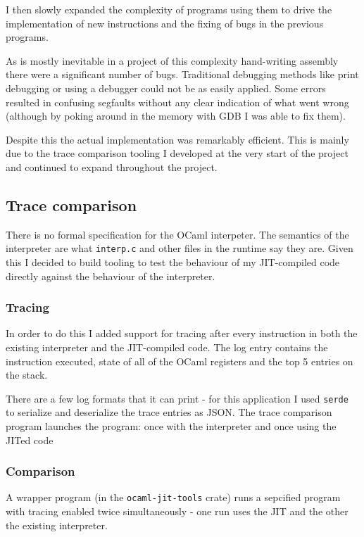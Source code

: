 I then slowly expanded the complexity of programs using them to drive the implementation of new
instructions and the fixing of bugs in the previous programs.

As is mostly inevitable in a project of this complexity hand-writing assembly there were a
significant number of bugs. Traditional debugging methods like print debugging or using a debugger
could not be as easily applied. Some errors resulted in confusing segfaults without any clear
indication
of what went wrong (although by poking around in the memory with GDB I was able to fix them).

Despite this the actual implementation was remarkably efficient. This is mainly due to the trace
comparison tooling I developed at the very start of the project and continued to expand throughout
the project.

\subsection{Trace comparison} \label{tracing}

There is no formal specification for the OCaml interpeter. The semantics of the interpreter are
what
\texttt{interp.c} and other files in the runtime say they are. Given this I decided to build
tooling to test the behaviour of my JIT-compiled code directly against the behaviour of the
interpreter.

\subsubsection{Tracing}

In order to do this I added support for tracing after every instruction in both the existing
interpreter and the JIT-compiled code. The log entry contains the instruction executed, state of
all of the OCaml registers and the top 5 entries on the stack.

There are a few log formats that it can print - for this application I used \texttt{serde} to
serialize and deserialize the trace entries as JSON. The trace comparison program launches the
program: once with the interpreter and once using the JITed code

\subsubsection{Comparison}

A wrapper program (in the \texttt{ocaml-jit-tools} crate) runs a sepcified program with
tracing enabled twice simultaneously - one run uses the JIT and the other the
existing interpreter.


